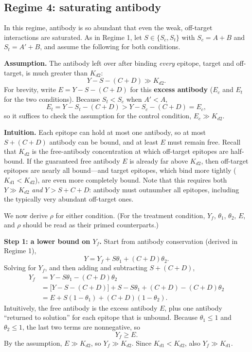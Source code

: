 \subsection{Regime 4: saturating antibody}

In this regime, antibody is so abundant that even the weak, off-target
interactions are saturated. As in Regime 1, let $S\in\{S_c,S_t\}$ with
$S_c=A+B$ and $S_t=A'+B$, and assume the following for both conditions.

\textbf{Assumption.} The antibody left over after binding \emph{every}
epitope, target and off-target, is much greater than $K_{d2}$:
$$
Y-S-(C+D)\gg K_{d2}.
$$
For brevity, write $E=Y-S-(C+D)$ for this \textbf{excess antibody}
($E_c$ and $E_t$ for the two conditions). Because $S_t<S_c$ when $A'<A$,
$$
E_t=Y-S_t-(C+D)>Y-S_c-(C+D)=E_c,
$$
so it suffices to check the assumption for the control condition,
$E_c\gg K_{d2}$.

\textbf{Intuition.} Each epitope can hold at most one antibody, so at
most $S+(C+D)$ antibody can be bound, and at least $E$ must remain free.
Recall that $K_{d2}$ is the free-antibody concentration at which
off-target epitopes are half-bound. If the guaranteed free antibody $E$
is already far above $K_{d2}$, then off-target epitopes are nearly all
bound---and target epitopes, which bind more tightly ($K_{d1}<K_{d2}$),
are even more completely bound. Note that this requires both $Y\gg K_{d2}$
\emph{and} $Y>S+C+D$: antibody must outnumber all epitopes, including the
typically very abundant off-target ones.

We now derive $\rho$ for either condition. (For the treatment condition,
$Y_f$, $\theta_1$, $\theta_2$, $E$, and $\rho$ should be read as their
primed counterparts.)

\textbf{Step 1: a lower bound on $Y_f$.} Start from antibody conservation
(derived in Regime 1),
$$
Y=Y_f+S\theta_1+(C+D)\theta_2.
$$
Solving for $Y_f$, and then adding and subtracting $S+(C+D)$,
$$\begin{aligned}
Y_f
&=Y-S\theta_1-(C+D)\theta_2 \\
&=\bigl[Y-S-(C+D)\bigr]+S-S\theta_1+(C+D)-(C+D)\theta_2 \\
&=E+S(1-\theta_1)+(C+D)(1-\theta_2).
\end{aligned}$$
Intuitively, the free antibody is the excess antibody $E$, plus one
antibody ``returned to solution'' for each epitope that is unbound.
Because $\theta_1\le1$ and $\theta_2\le1$, the last two terms are
nonnegative, so
\begin{equation}
Y_f\ge E.
\label{eq:r4-1}
\end{equation}
By the assumption, $E\gg K_{d2}$, so $Y_f\gg K_{d2}$. Since $K_{d1}<K_{d2}$,
also $Y_f\gg K_{d1}$.

